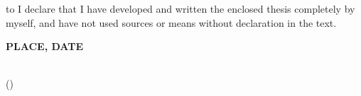 \documentclass[../thesis.tex]{subfiles}
\begin{document}
\thispagestyle{empty}
\null\vfill
\noindent\hbox to \textwidth{\hrulefill} 
I declare that I have developed and written the enclosed
thesis completely by myself, and have not used sources or means without
declaration in the text.
 
\textbf{PLACE, DATE}
\vspace{1.5cm}
 
\dotfill\hspace*{8.0cm}\\
\hspace*{2cm}(\theauthor) 
\cleardoublepage
\end{document}
